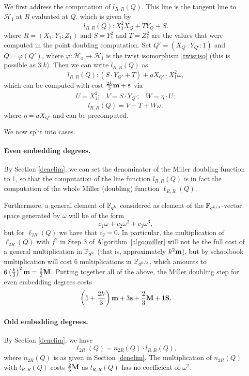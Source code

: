 We first address the computation of $l_{R,R}(Q)$.
This line is the tangent line to $\mathcal{H}_1$ at $R$ evaluated at $Q$, 
which is given by
\[l_{R,R}(Q): X_1^2 X_Q + T Y_Q + S.\]
where $R = (X_1:Y_1:Z_1)$ 
and $S=Y_1^2$ and $T=Z_1^2$ are the values 
that were computed in the point doubling computation.
Set $Q' = (X_{Q'}:Y_{Q'}:1)$ and $Q = \varphi(Q')$, where
$\varphi : \mathcal{H}_a \rightarrow \mathcal{H}_1$ 
is the twist isomorphism \eqref{twistiso}
(this is possible as $3|k$).
Then we can write $l_{R,R}(Q)$ as
\[l_{R,R}(Q): (S \cdot Y_{Q'} + T) + a X_{Q'} \cdot X_1^2 \omega,\]
which can be computed with cost
$\frac{2k}{3}\textbf{m} + \textbf{s}$
via
\[\begin{array}{ccc}
U = X_1^2; & V = S \cdot Y_{Q'}; & W = \eta \cdot U;
\end{array}\]
\[l_{R,R}(Q)= V+T + W\omega,\]
where $\eta = aX_{Q'}$ and can be precomputed.

We now split into cases.

\paragraph*{Even embedding degrees.}

By Section \ref{denelim}, we can set the denominator of the Miller doubling function to 1, so that the computation of the line function $l_{R,R}(Q)$ is in fact
the computation of the whole Miller (doubling) function $\ell_{R,R}(Q)$.

Furthermore, a general element of $\mathbb{F}_{q^k}$ considered as element of the 
$\mathbb{F}_{q^{k/3}}$-vector space generated
by $\omega$ will be of the form 
\[c_1 \omega + c_2 \omega^2 + c_3 \omega^3,\]
but for $\ell_{2R}(Q)$ we have that $c_2 = 0$. 
In particular, the multiplication of $\ell_{2R}(Q)$ with $f^2$ in
Step 3 of Algorithm~\ref{algo:miller} will not be the full cost of a general multiplication in $\mathbb{F}_{q^k}$ (that
is, approximately $k^2\textbf{m}$), 
but by schoolbook multiplication will cost 6 multiplications in $\mathbb{F}_{q^{k/3}}$, 
which amounts to 
$6 \left(\frac{k}{3}\right)^2 \textbf{m} = \frac{2}{3} \textbf{M}$.
Putting together all of the above, the Miller doubling step for even
embedding degrees costs
\[\left( 5 + \frac{2k}{3}\right)\textbf{m} + 3\textbf{s} + \frac{2}{3}\textbf{M} + 1\textbf{S}.\]

\paragraph*{Odd embedding degrees.}

By Section \ref{denelim}, we have
\[\ell_{2R}(Q) = n_{2R}(Q) \cdot l_{R,R}(Q),\]
where $n_{2R}(Q)$ is as given in Section \ref{denelim}.
The multiplication of $n_{2R}(Q)$ with $l_{R,R}(Q)$ 
costs $\frac{2}{3}\textbf{M}$ 
as $l_{R,R}(Q)$ has no coefficient of $\omega^2$.

